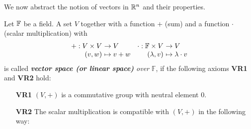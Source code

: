 \begin{frame}[c]
We now abstract the notion of vectors in ${\mathbb{R}}^n$ and their properties. 
\begin{definition}
Let ${\mathbb{F}}$ be a field. A set $V$ together with a function $+$ 
(sum) and a function $\cdot$ (scalar multiplication) with 
\begin{eqnarray*} \begin{array}{r@{~}lr@{~}l} 
		+: V \times V & \to V & \cdot : \F \times V & \to V \\ 
		(v,w)       & \mapsto v+ w    & (\lambda, v) & \mapsto \lambda \cdot v  
\end{array} \end{eqnarray*} 
is called \emph{\textbf{vector space (or linear space)} over $\mathbb{F}$}, if the following axioms \textbf{VR1} and \textbf{VR2} hold: 

\begin{itemize} 
	\item[\textbf{VR1}] $(V,+)$ is a commutative group with neutral element $0$.%
	\item[\textbf{VR2}] The scalar multiplication is compatible with 
	$(V,+)$ in the following way:  
	

\end{itemize}
\end{definition}
\end{frame}
